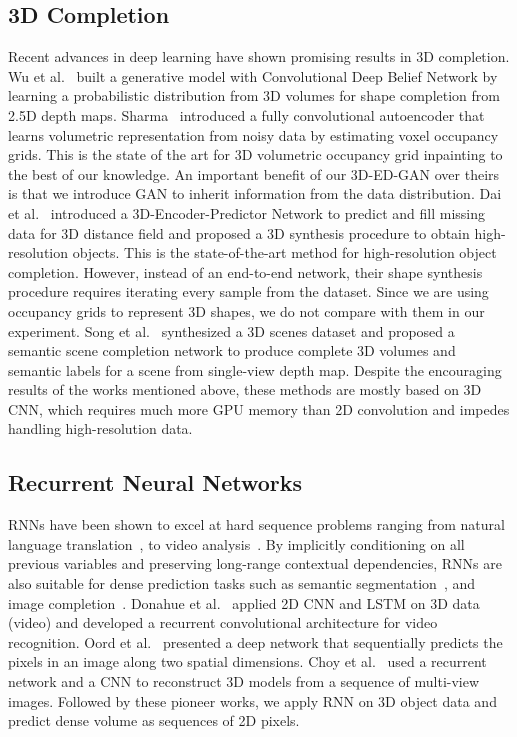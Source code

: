 \documentclass[10pt,twocolumn,letterpaper]{article}
\begin{document}
\subsection{3D Completion}

Recent advances in deep learning have shown promising results in 3D completion. Wu et al.~\cite{modelnet} built a generative model with Convolutional Deep Belief Network by learning a probabilistic distribution from 3D volumes for shape completion from 2.5D depth maps. Sharma~\cite{vconvdae} introduced a fully convolutional autoencoder that learns volumetric representation from noisy data by estimating voxel occupancy grids. This is the state of the art for 3D volumetric occupancy grid inpainting to the best of our knowledge. An important benefit of our 3D-ED-GAN over theirs is that we introduce GAN to inherit information from the data distribution. Dai et al.~\cite{3depn} introduced a 3D-Encoder-Predictor Network to predict and fill missing data for 3D distance field and proposed a 3D synthesis procedure to obtain high-resolution objects. This is the state-of-the-art method for high-resolution object completion. However, instead of an end-to-end network, their shape synthesis procedure requires iterating every sample from the dataset. Since we are using occupancy grids to represent 3D shapes, we do not compare with them in our experiment. Song et al.~\cite{ssn} synthesized a 3D scenes dataset and proposed a semantic scene completion network to produce complete 3D volumes and semantic labels for a scene from single-view depth map.  Despite the encouraging results of the works mentioned above, these methods are mostly based on 3D CNN, which requires much more GPU memory than 2D convolution and impedes handling high-resolution data. 

\subsection{Recurrent Neural Networks}
RNNs have been shown to excel at hard sequence problems ranging from natural language translation~\cite{recurrenttranslation}, to video analysis~\cite{LRCNvideo}. By implicitly conditioning on all previous variables and preserving long-range contextual dependencies, RNNs are also suitable for dense prediction tasks such as semantic segmentation~\cite{reseg,scenelabelinglstm}, and image completion~\cite{pixelrnn}. Donahue et al.~\cite{LRCNvideo} applied 2D CNN and LSTM on 3D data (video) and developed a recurrent convolutional architecture for video recognition. Oord et al.~\cite{pixelrnn} presented a deep network that sequentially predicts the pixels in an image along two spatial dimensions. Choy et al.~\cite{r2n2} used a recurrent network and a CNN to reconstruct 3D models from a sequence of multi-view images. Followed by these pioneer works, we apply RNN on 3D object data and predict dense volume as sequences of 2D pixels. 
\end{document}
